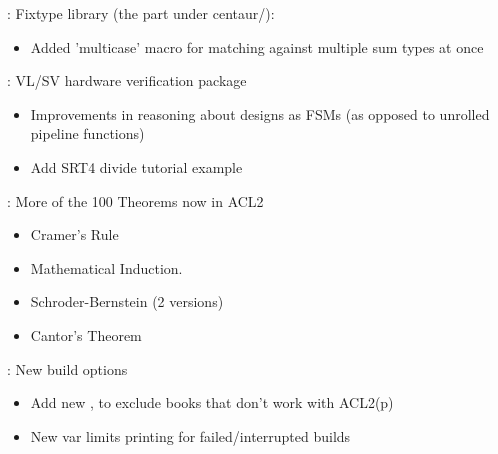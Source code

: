 
\begin{frame}

\implibtitle

:
Fixtype library (the part under centaur/):
\begin{itemize}
\item Added 'multicase' macro for matching against multiple sum types at once
\end{itemize}

\end{frame}


\begin{frame}

\implibtitle

:
VL/SV hardware verification package
\begin{itemize}
\item Improvements in reasoning about designs as FSMs (as opposed to unrolled pipeline functions)
\item Add SRT4 divide tutorial example

\end{itemize}

\end{frame}


\begin{frame}

\implibtitle

: More of the 100 Theorems now in ACL2
\begin{itemize}
\item Cramer's Rule
\item Mathematical Induction.
\item Schroder-Bernstein (2 versions)
\item Cantor's Theorem
\end{itemize}

\end{frame}


\begin{frame}

\implibtitle

: New build options
\begin{itemize}
\item Add new  , to exclude books that don't work with ACL2(p)
\item New  var limits printing for failed/interrupted builds
\end{itemize}

\end{frame}

